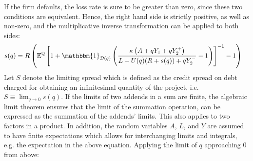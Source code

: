 \documentclass[../main.tex]{subfiles}
\begin{document}
        If the firm defaults, the loss rate is sure to be greater than zero,
        since these two conditions are equivalent. 
        Hence, the right hand side is strictly positive, as well as non-zero,
        and the multiplicative inverse transformation can be applied to both sides:
            \begin{align}
                    s(q)
                &=
                    \grossrfrate
                    \left(
                        \mathbb{E}^{\rnmeasure}\left[
                            1
                            +
                            \mathbbm{1}_{\mathcal{D}(q)}
                            \left(
                                \frac{
                                    \kappa 
                                    \left(
                                        A + q Y_{1} + q Y_{2}^{+}
                                    \right)
                                }{
                                    L 
                                    +
                                    U(q)
                                    (\grossrfrate + s(q))
                                    +
                                    q Y_{2}^{-} 
                                }
                                -
                                1
                            \right) 
                        \right]^{-1}
                        - 
                        1
                    \right)
                \nonumber
            \end{align}
        Let $S$ denote the limiting spread which is defined as the credit spread on debt 
        charged for obtaining an infinitesimal quantity of the project, i.e.
        $S \equiv \lim_{q\rightarrow 0} s(q)$.
        If the limits of two addends in a sum are finite, 
        the algebraic limit theorem ensures that the limit of the summation operation,
        can be expressed as the summation of the addends' limits.
        This also applies to two factors in a product.
        In addition, the random variables $A$, $L$, and $Y$ are assumed to have finite expectations
        which allows for interchanging limits and integrals, e.g. the expectation in the above equation.
        Applying the limit of $q$ approaching $0$ from above:
\end{document}
